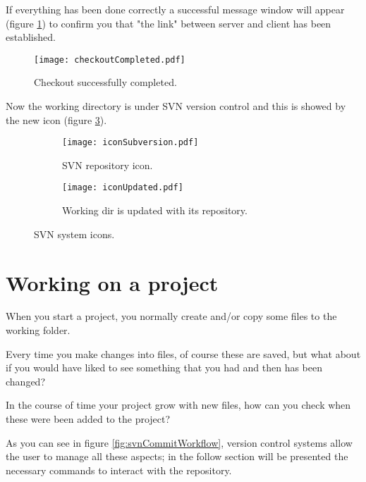 If everything has been done correctly a successful message window will appear (figure \ref{fig:checkoutCompleted}) to confirm you that "the link" between server and client has been established.

\begin{figure}[htbp]
    \centering
    \texttt{[image: checkoutCompleted.pdf]}
    \caption{Checkout successfully completed.}
    \label{fig:checkoutCompleted}
\end{figure}

Now the working directory is under SVN version control and this is showed by the new icon (figure \ref{fig:iconWorkingUpdated}).

\begin{figure}[htpb]
\begin{subfigure}{0.45\textwidth}
  \centering
  \texttt{[image: iconSubversion.pdf]}
  \caption{SVN repository icon.}
  \label{fig:iconRepository}
\end{subfigure}%
\begin{subfigure}{0.45\textwidth}
  \centering
  \texttt{[image: iconUpdated.pdf]}
  \caption{Working dir is updated with its repository.}
  \label{fig:iconWorkingUpdated}
\end{subfigure}
\caption{SVN system icons.}
\label{fig:systemIcons_1}
\end{figure}


\newpage











\section{Working on a project}
\label{section:WorkOnProject}

When you start a project, you normally create and/or copy some files to the working folder.

Every time you make changes into files, of course these are saved, but what about if you would have liked to see something that you had and then has been changed?

In the course of time your project grow with new files, how can you check when these were been added to the project?

As you can see in figure \ref{fig:svnCommitWorkflow}, version control systems allow the user to manage all these aspects; in the follow section will be presented the necessary commands to interact with the repository.



